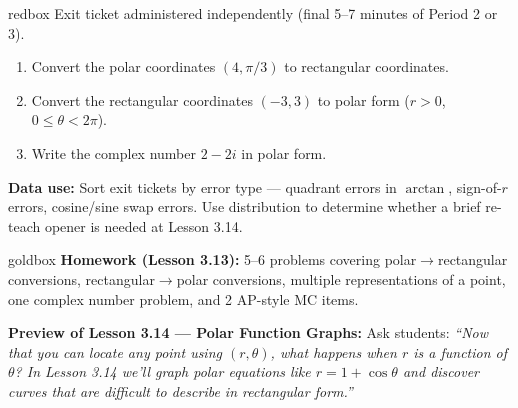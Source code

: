 \documentclass[10pt]{article}
\begin{document}
\vspace{0.08in}

\begin{skillbox}{redbox}
Exit ticket administered independently (final 5--7 minutes of Period 2 or 3).

\begin{enumerate}[leftmargin=1.4em, itemsep=4pt]
  \item Convert the polar coordinates $(4,\pi/3)$ to rectangular coordinates.
  \item Convert the rectangular coordinates $(-3,3)$ to polar form ($r > 0$,
    $0 \le \theta < 2\pi$).
  \item Write the complex number $2-2i$ in polar form.
\end{enumerate}

\textbf{Data use:} Sort exit tickets by error type --- quadrant errors in
$\arctan$, sign-of-$r$ errors, cosine/sine swap errors. Use distribution
to determine whether a brief re-teach opener is needed at Lesson 3.14.
\end{skillbox}

\vspace{0.08in}

\begin{skillbox}{goldbox}
\textbf{Homework (Lesson 3.13):} 5--6 problems covering polar$\to$rectangular
conversions, rectangular$\to$polar conversions, multiple representations of a
point, one complex number problem, and 2 AP-style MC items.

\textbf{Preview of Lesson 3.14 --- Polar Function Graphs:}
Ask students: \textit{``Now that you can locate any point using $(r,\theta)$,
what happens when $r$ is a \emph{function} of $\theta$? In Lesson 3.14 we'll
graph polar equations like $r = 1+\cos\theta$ and discover curves that are
difficult to describe in rectangular form.''}
\end{skillbox}
\end{document}
